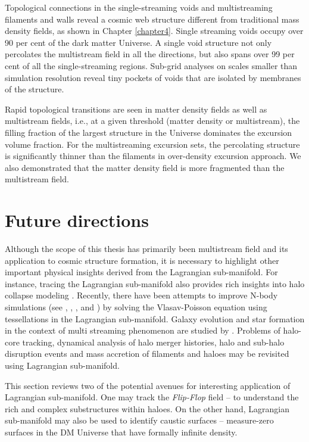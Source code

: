 Topological connections in the single-streaming voids and multistreaming filaments and walls reveal a cosmic web structure different from traditional mass density fields, as shown in Chapter \ref{chapter4}. Single streaming voids occupy over 90 per cent of the dark matter Universe. A single void structure not only percolates the multistream field in all the directions, but also spans over 99 per cent of all the single-streaming regions. Sub-grid analyses on scales smaller than simulation resolution reveal tiny pockets of voids that are isolated by membranes of the structure. 

Rapid topological transitions are seen in matter density fields as well as multistream fields, i.e., at a given threshold (matter density or multistream), the filling fraction of the largest structure in the Universe dominates the excursion volume fraction. For the multistreaming excursion sets, the percolating structure is significantly thinner than the filaments in over-density excursion approach. We also demonstrated that the matter density field is more fragmented than the multistream field. 
 


\section{Future directions}

Although the scope of this thesis has primarily been multistream field and its application to cosmic structure formation, it is necessary to highlight other important physical insights derived from the Lagrangian sub-manifold. For instance, tracing the Lagrangian sub-manifold also provides rich insights into halo collapse modeling \cite{Neyrinck2016}. Recently, there have been attempts to improve N-body simulations (see \cite{Hahn2013}, \cite{Angulo2013a}, \cite{Angulo2013b}, \cite{Sousbie2015} and \cite{Hahn2016a}) by solving the Vlasav-Poisson equation using tessellations in the Lagrangian sub-manifold. Galaxy evolution and star formation in the context of multi streaming phenomenon are studied by \cite{Aragon-Calvo2016}. Problems of halo-core tracking, dynamical analysis of halo merger histories, halo and sub-halo disruption events and mass accretion of filaments and haloes may be revisited using Lagrangian sub-manifold.

This section reviews two of the potential avenues for interesting application of Lagrangian sub-manifold. One may track the {\it Flip-Flop} field -- to understand the rich and complex substructures within haloes. On the other hand, Lagrangian sub-manifold may also be used to identify caustic surfaces -- measure-zero surfaces in the DM Universe that have formally infinite density. 


